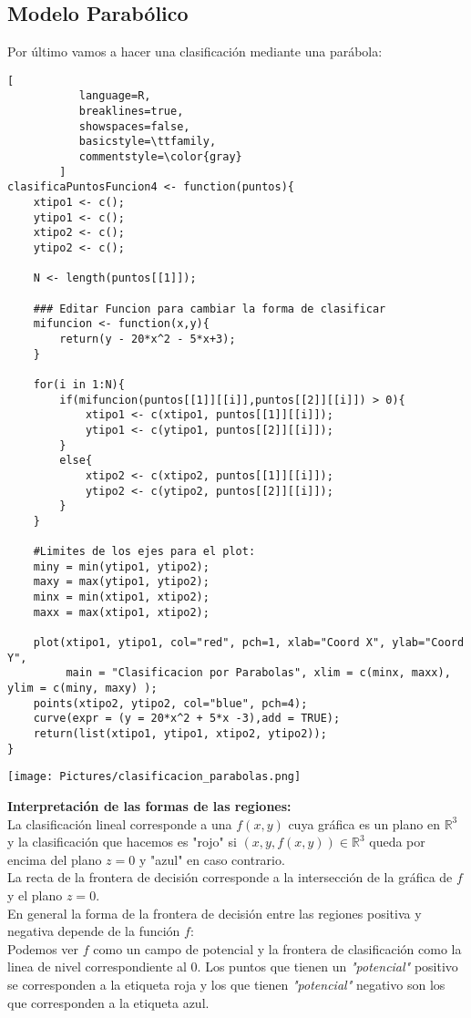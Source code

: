 \documentclass[11pt,fleqn]{book} %
\begin{document}
\subsection{Modelo Parabólico}
Por último vamos a hacer una clasificación mediante una parábola:
\begin{lstlisting}[
           language=R,
           breaklines=true,
           showspaces=false,
           basicstyle=\ttfamily,
           commentstyle=\color{gray}
        ]
clasificaPuntosFuncion4 <- function(puntos){
    xtipo1 <- c();
    ytipo1 <- c();
    xtipo2 <- c();
    ytipo2 <- c();
    
    N <- length(puntos[[1]]);
    
    ### Editar Funcion para cambiar la forma de clasificar
    mifuncion <- function(x,y){
        return(y - 20*x^2 - 5*x+3);
    }
    
    for(i in 1:N){
        if(mifuncion(puntos[[1]][[i]],puntos[[2]][[i]]) > 0){
            xtipo1 <- c(xtipo1, puntos[[1]][[i]]);
            ytipo1 <- c(ytipo1, puntos[[2]][[i]]);
        }
        else{
            xtipo2 <- c(xtipo2, puntos[[1]][[i]]);
            ytipo2 <- c(ytipo2, puntos[[2]][[i]]);
        }
    }
    
    #Limites de los ejes para el plot:
    miny = min(ytipo1, ytipo2);
    maxy = max(ytipo1, ytipo2);
    minx = min(xtipo1, xtipo2);
    maxx = max(xtipo1, xtipo2);
    
    plot(xtipo1, ytipo1, col="red", pch=1, xlab="Coord X", ylab="Coord Y", 
         main = "Clasificacion por Parabolas", xlim = c(minx, maxx), ylim = c(miny, maxy) );
    points(xtipo2, ytipo2, col="blue", pch=4);
    curve(expr = (y = 20*x^2 + 5*x -3),add = TRUE);
    return(list(xtipo1, ytipo1, xtipo2, ytipo2));
}
\end{lstlisting}

\texttt{[image: Pictures/clasificacion\_parabolas.png]}

\textbf{Interpretación de las formas de las regiones:}\\
La clasificación lineal corresponde a una $f(x,y)$ cuya gráfica es un plano en $\mathbb{R}^3$ y la clasificación que hacemos es "rojo" si $(x,y,f(x,y))\in \mathbb{R}^3$ queda por encima del plano $z=0$ y "azul" en caso contrario.\\
La recta de la frontera de decisión corresponde a la intersección de la gráfica de $f$ y el plano $z=0$.\\
En general la forma de la frontera de decisión entre las regiones positiva y negativa depende de la función $f$:\\
Podemos ver $f$ como un campo de potencial y la frontera de clasificación como la linea de nivel correspondiente al $0$. Los puntos que tienen un \textit{"potencial"} positivo se corresponden a la etiqueta roja y los que tienen \textit{"potencial"} negativo son los que corresponden a la etiqueta azul.
\end{document}
